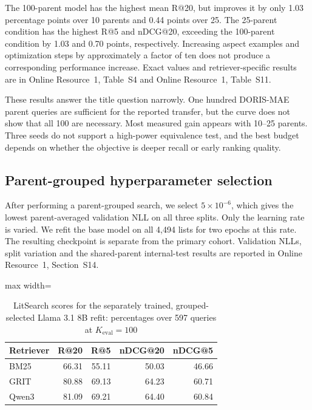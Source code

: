 \documentclass[pdflatex,sn-basic,Numbered]{sn-jnl}%
\theoremstyle{thmstyleone}%
\theoremstyle{thmstyletwo}%
\theoremstyle{thmstylethree}%
\begin{document}
The 100-parent model has the highest mean R@20, but improves it by only 1.03
percentage points over 10 parents and 0.44 points over 25. The 25-parent condition
has the highest R@5 and nDCG@20, exceeding the 100-parent condition by 1.03 and
0.70 points, respectively. Increasing aspect examples and optimization steps by
approximately a factor of ten does not produce a corresponding performance
increase. Exact values and retriever-specific results are in
Online Resource~1, Table~S4 and Online Resource~1, Table~S11.

These results answer the title question narrowly. One hundred DORIS-MAE parent
queries are sufficient for the reported transfer, but the curve does not show
that all 100 are necessary. Most measured gain appears with 10--25 parents.
Three seeds do not support a high-power equivalence test, and the best budget
depends on whether the objective is deeper recall or early ranking quality.

\subsection{Parent-grouped hyperparameter selection}
\label{sec:grouped-hpo}
After performing a parent-grouped search, we select $5\times10^{-6}$, which gives the lowest
parent-averaged validation NLL on all three splits. Only the learning rate is
varied. We refit the base model on all 4,494 lists for two epochs at this rate. The resulting checkpoint is separate from the primary cohort. Validation NLLs,
split variation and the shared-parent internal-test results are reported in
Online Resource~1, Section~S14.

\begin{table}[t]


\centering
\small
\setlength{\tabcolsep}{4pt}
\begin{adjustbox}{max width=\linewidth}
\begin{tabular}{lrrrr}
\hline
Retriever & R@20 & R@5 & nDCG@20 & nDCG@5 \\
\hline
BM25  & 66.31 & 55.11 & 50.03 & 46.66 \\
GRIT  & 80.88 & 69.13 & 64.23 & 60.71 \\
Qwen3 & 81.09 & 69.21 & 64.40 & 60.84 \\
\hline
\end{tabular}
\end{adjustbox}


\caption{LitSearch scores for the separately trained, grouped-selected Llama 3.1 8B refit: percentages over 597 queries at $K_{\mathrm{eval}}=100$}
\label{tab:grouped-hpo-litsearch}
\end{table}
\end{document}
